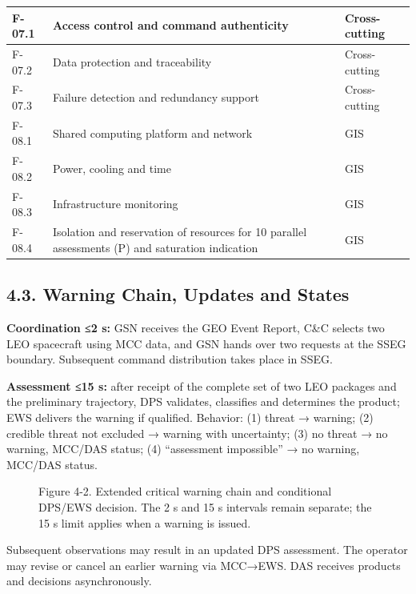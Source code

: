 \begin{longtable}{|P{0.20}|P{0.65}|P{0.15}|}
F-07.1 & Access control and command authenticity & Cross-cutting\\ \hline
F-07.2 & Data protection and traceability & Cross-cutting\\ \hline
F-07.3 & Failure detection and redundancy support & Cross-cutting\\ \hline
F-08.1 & Shared computing platform and network & GIS\\ \hline
F-08.2 & Power, cooling and time & GIS\\ \hline
F-08.3 & Infrastructure monitoring & GIS\\ \hline
F-08.4 & Isolation and reservation of resources for 10 parallel assessments (P) and saturation indication & GIS\\*
\end{longtable}
\endgroup

\subsection{4.3. Warning Chain, Updates and States}\label{functional-chains-and-operational-states}\label{critical-warning-chain}\label{supporting-and-update-chains}\label{states-and-degraded-operations}

\textbf{Coordination ≤2 s:} GSN receives the GEO Event Report, C\&C selects two LEO spacecraft using MCC data, and GSN hands over two requests at the SSEG boundary. Subsequent command distribution takes place in SSEG.

\textbf{Assessment ≤15 s:} after receipt of the complete set of two LEO packages and the preliminary trajectory, DPS validates, classifies and determines the product; EWS delivers the warning if qualified. Behavior: (1) threat → warning; (2) credible threat not excluded → warning with uncertainty; (3) no threat → no warning, MCC/\allowbreak{}DAS status; (4) “assessment impossible” → no warning, MCC/\allowbreak{}DAS status.

\begin{figure}[H]
\centering

\caption{Figure 4-2. Extended critical warning chain and conditional
DPS/EWS decision. The 2 s and 15 s intervals remain separate; the 15 s
limit applies when a warning is issued.}
\end{figure}

Subsequent observations may result in an updated DPS assessment. The operator may revise or cancel an earlier warning via MCC→EWS. DAS receives products and decisions asynchronously.

